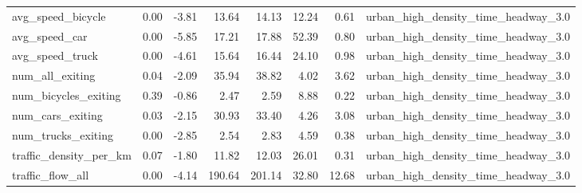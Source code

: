 \begin{table}[ht]
\begin{tabular}{lrrrrrrl}
  avg\_speed\_bicycle & 0.00 & -3.81 & 13.64 & 14.13 & 12.24 & 0.61 & urban\_high\_density\_time\_headway\_3.0 \\ 
  avg\_speed\_car & 0.00 & -5.85 & 17.21 & 17.88 & 52.39 & 0.80 & urban\_high\_density\_time\_headway\_3.0 \\ 
  avg\_speed\_truck & 0.00 & -4.61 & 15.64 & 16.44 & 24.10 & 0.98 & urban\_high\_density\_time\_headway\_3.0 \\ 
  num\_all\_exiting & 0.04 & -2.09 & 35.94 & 38.82 & 4.02 & 3.62 & urban\_high\_density\_time\_headway\_3.0 \\ 
  num\_bicycles\_exiting & 0.39 & -0.86 & 2.47 & 2.59 & 8.88 & 0.22 & urban\_high\_density\_time\_headway\_3.0 \\ 
  num\_cars\_exiting & 0.03 & -2.15 & 30.93 & 33.40 & 4.26 & 3.08 & urban\_high\_density\_time\_headway\_3.0 \\ 
  num\_trucks\_exiting & 0.00 & -2.85 & 2.54 & 2.83 & 4.59 & 0.38 & urban\_high\_density\_time\_headway\_3.0 \\ 
  traffic\_density\_per\_km & 0.07 & -1.80 & 11.82 & 12.03 & 26.01 & 0.31 & urban\_high\_density\_time\_headway\_3.0 \\ 
  traffic\_flow\_all & 0.00 & -4.14 & 190.64 & 201.14 & 32.80 & 12.68 & urban\_high\_density\_time\_headway\_3.0 \\ 
   \hline
\end{tabular}
\end{table}
